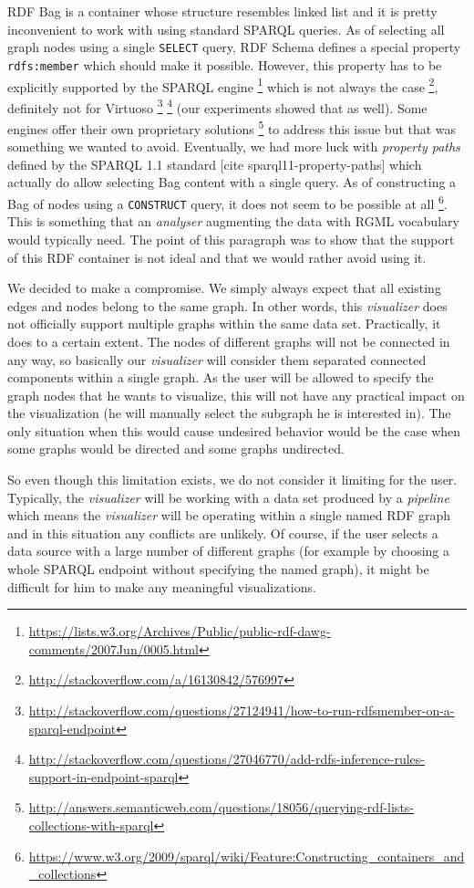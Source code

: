 RDF Bag \cite{rdf_vocab} is a container whose structure resembles linked list and it is pretty inconvenient to work with using standard SPARQL queries. As of selecting all graph nodes using a single \texttt{SELECT} query, RDF Schema defines a special property \texttt{rdfs:member} which should make it possible. However, this property has to be explicitly supported by the SPARQL engine 
\footnote{\url{https://lists.w3.org/Archives/Public/public-rdf-dawg-comments/2007Jun/0005.html}} which is not always the case 
\footnote{\url{http://stackoverflow.com/a/16130842/576997}}, definitely not for Virtuoso
\footnote{\url{http://stackoverflow.com/questions/27124941/how-to-run-rdfsmember-on-a-sparql-endpoint}}
\footnote{\url{http://stackoverflow.com/questions/27046770/add-rdfs-inference-rules-support-in-endpoint-sparql}} (our experiments showed that as well). Some engines offer their own proprietary solutions 
\footnote{\url{http://answers.semanticweb.com/questions/18056/querying-rdf-lists-collections-with-sparql}} to address this issue but that was something we wanted to avoid. Eventually, we had more luck with \emph{property paths} defined by the SPARQL 1.1 standard [cite sparql11-property-paths] which actually do allow selecting Bag content with a single query.  As of constructing a Bag of nodes using  a \texttt{CONSTRUCT} query, it does not seem to be possible at all 
\footnote{\url{https://www.w3.org/2009/sparql/wiki/Feature:Constructing\_containers\_and\_collections}}. This is something that an \emph{analyser} augmenting the data with RGML vocabulary would typically need. The point of this paragraph was to show that the support of this RDF container is not ideal and that we would rather avoid using it.

We decided to make a compromise. We simply always expect that all existing edges and nodes belong to the same graph. In other words, this \emph{visualizer} does not officially support multiple graphs within the same data set. Practically, it does to a certain extent. The nodes of different graphs will not be connected in any way, so basically our \emph{visualizer} will consider them separated connected components within a single graph. As the user will be allowed to specify the graph nodes that he wants to visualize, this will not have any practical impact on the visualization (he will manually select the subgraph he is interested in). The only situation when this would cause undesired behavior would be the case when some graphs would be directed and some graphs undirected. 

So even though this limitation exists, we do not consider it limiting for the user. Typically, the \emph{visualizer} will be working with a data set produced by a \emph{pipeline} which means the \emph{visualizer} will be operating within a single named RDF graph and in this situation any conflicts are unlikely. Of course, if the user selects a data source with a large number of different graphs (for example by choosing a whole SPARQL endpoint without specifying the named graph), it might be difficult for him to make any meaningful visualizations.

